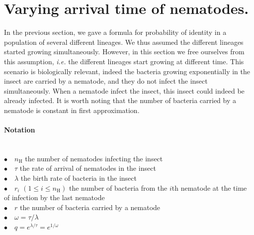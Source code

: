 \documentclass{article}
\newcommand{\nN}{{n_\textrm{H}}}
\begin{document}
\section{Varying arrival time of nematodes.}
\label{section_nematode}
In the previous section, we gave a formula for probability of identity in a population of several different lineages. We thus assumed the different lineages started growing simultaneously.
However, in this section we free ourselves from this assumption, \textit{i.e.} the different lineages start growing at different time. This scenario is biologically relevant, indeed the bacteria growing exponentially in the insect are carried by a nematode, and they do not infect the insect simultaneously. When a nematode infect the insect, this insect could indeed be already infected. It is worth noting that the number of bacteria carried by a nematode is constant in first approximation. 
 \paragraph{Notation} $ $\\
 $\bullet \quad \nN$ the number of nematodes infecting the insect\\
 $\bullet \quad \tau$ the rate of arrival of nematodes in the insect\\
 $\bullet \quad \lambda$ the birth rate of bacteria in the insect\\
 $\bullet \quad r_i$ $( 1 \leq i \leq \nN )$ the number of bacteria from the $i$th nematode at the time of infection by the last nematode\\
 $\bullet \quad r$ the number of bacteria carried by a nematode \\
 $\bullet \quad \omega = \tau /  \lambda $ \\
 $\bullet \quad q=e^{ \lambda / \tau}=e^{ 1/ \omega}$
 
\end{document}

